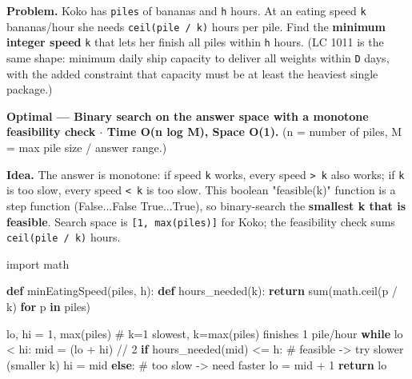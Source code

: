 \documentclass[11pt]{article}
\newenvironment{Shaded}{\begin{snugshade}}{\end{snugshade}}
\newcommand{\BuiltInTok}[1]{\textcolor[rgb]{0.50,0.55,0.55}{#1}}
\newcommand{\CommentTok}[1]{\textcolor[rgb]{0.48,0.49,0.49}{#1}}
\newcommand{\ControlFlowTok}[1]{\textcolor[rgb]{0.99,0.74,0.29}{\textbf{#1}}}
\newcommand{\DecValTok}[1]{\textcolor[rgb]{0.96,0.45,0.00}{#1}}
\newcommand{\ImportTok}[1]{\textcolor[rgb]{0.15,0.68,0.38}{#1}}
\newcommand{\KeywordTok}[1]{\textcolor[rgb]{0.81,0.81,0.76}{\textbf{#1}}}
\newcommand{\NormalTok}[1]{\textcolor[rgb]{0.81,0.81,0.76}{#1}}
\newcommand{\OperatorTok}[1]{\textcolor[rgb]{0.81,0.81,0.76}{#1}}
\begin{document}
\textbf{Problem.} Koko has \texttt{piles} of bananas and \texttt{h} hours. At an eating speed \texttt{k} bananas/hour she needs \texttt{ceil(pile\ /\ k)} hours per pile. Find the \textbf{minimum integer speed} \texttt{k} that lets her finish all piles within \texttt{h} hours. (LC 1011 is the same shape: minimum daily ship capacity to deliver all weights within \texttt{D} days, with the added constraint that capacity must be at least the heaviest single package.)

\textbf{Optimal --- Binary search on the answer space with a monotone feasibility check \(\cdot\) Time O(n log M), Space O(1).} (n = number of piles, M = max pile size / answer range.)

\textbf{Idea.} The answer is monotone: if speed \texttt{k} works, every speed \texttt{\textgreater{}\ k} also works; if \texttt{k} is too slow, every speed \texttt{\textless{}\ k} is too slow. This boolean "feasible(k)" function is a step function (False...False True...True), so binary-search the \textbf{smallest k that is feasible}. Search space is \texttt{{[}1,\ max(piles){]}} for Koko; the feasibility check sums \texttt{ceil(pile\ /\ k)} hours.


\begin{Shaded}
\begin{Highlighting}[]
\ImportTok{import}\NormalTok{ math}

\KeywordTok{def}\NormalTok{ minEatingSpeed(piles, h):}
    \KeywordTok{def}\NormalTok{ hours\_needed(k):}
        \ControlFlowTok{return} \BuiltInTok{sum}\NormalTok{(math.ceil(p }\OperatorTok{/}\NormalTok{ k) }\ControlFlowTok{for}\NormalTok{ p }\KeywordTok{in}\NormalTok{ piles)}

\NormalTok{    lo, hi }\OperatorTok{=} \DecValTok{1}\NormalTok{, }\BuiltInTok{max}\NormalTok{(piles)              }\CommentTok{\# k=1 slowest, k=max(piles) finishes 1 pile/hour}
    \ControlFlowTok{while}\NormalTok{ lo }\OperatorTok{\textless{}}\NormalTok{ hi:}
\NormalTok{        mid }\OperatorTok{=}\NormalTok{ (lo }\OperatorTok{+}\NormalTok{ hi) }\OperatorTok{//} \DecValTok{2}
        \ControlFlowTok{if}\NormalTok{ hours\_needed(mid) }\OperatorTok{\textless{}=}\NormalTok{ h:      }\CommentTok{\# feasible {-}\textgreater{} try slower (smaller k)}
\NormalTok{            hi }\OperatorTok{=}\NormalTok{ mid}
        \ControlFlowTok{else}\NormalTok{:                           }\CommentTok{\# too slow {-}\textgreater{} need faster}
\NormalTok{            lo }\OperatorTok{=}\NormalTok{ mid }\OperatorTok{+} \DecValTok{1}
    \ControlFlowTok{return}\NormalTok{ lo}
\end{Highlighting}
\end{Shaded}
\end{document}
